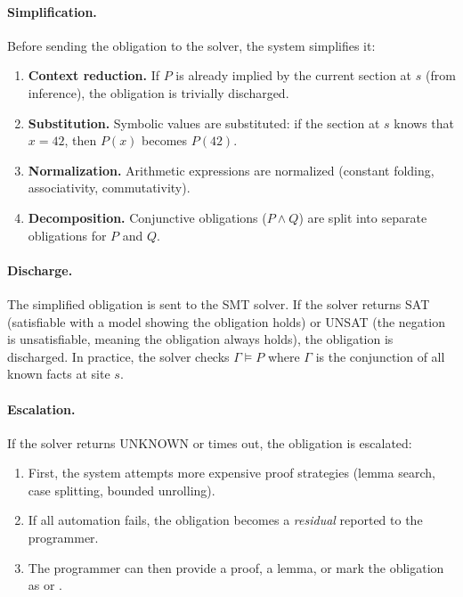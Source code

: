 \documentclass[11pt]{report}
\DeclareRobustCommand{\py}[1]{\texttt{\detokenize{#1}}}
\theoremstyle{definition}
\theoremstyle{plain}
\begin{document}
\paragraph{Simplification.}
Before sending the obligation to the solver, the system simplifies it:
\begin{enumerate}[nosep]
  \item \textbf{Context reduction.} If $P$ is already implied by the
        current section at $s$ (from inference), the obligation is trivially
        discharged.
  \item \textbf{Substitution.} Symbolic values are substituted: if the
        section at $s$ knows that $x = 42$, then $P(x)$ becomes $P(42)$.
  \item \textbf{Normalization.} Arithmetic expressions are normalized
        (constant folding, associativity, commutativity).
  \item \textbf{Decomposition.} Conjunctive obligations ($P \wedge Q$) are
        split into separate obligations for $P$ and $Q$.
\end{enumerate}

\paragraph{Discharge.}
The simplified obligation is sent to the SMT solver. If the solver returns
SAT (satisfiable with a model showing the obligation holds) or UNSAT
(the negation is unsatisfiable, meaning the obligation always holds), the
obligation is discharged. In practice, the solver checks
$\Gamma \models P$ where $\Gamma$ is the conjunction of all known facts at
site $s$.

\paragraph{Escalation.}
If the solver returns UNKNOWN or times out, the obligation is escalated:
\begin{enumerate}[nosep]
  \item First, the system attempts more expensive proof strategies
        (lemma search, case splitting, bounded unrolling).
  \item If all automation fails, the obligation becomes a \emph{residual}
        reported to the programmer.
  \item The programmer can then provide a proof, a lemma, or mark the
        obligation as \py{sorry()} or \py{@assume}.
\end{enumerate}
\end{document}
